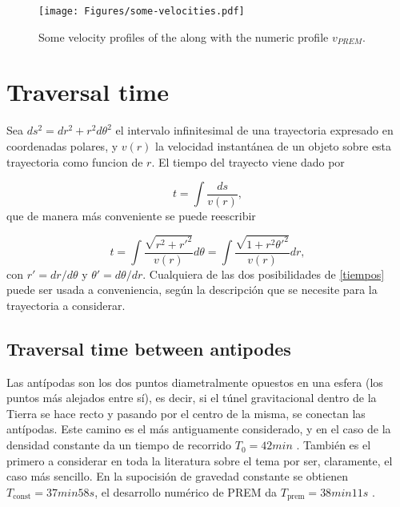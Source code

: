 \documentclass[aps,twocolumn,showpacs,preprintnumbers]{revtex4}
\begin{document}
    \begin{figure}
        \centering
        \texttt{[image: Figures/some-velocities.pdf]}
        \caption{Some velocity profiles of  the along with the numeric profile $v_{PREM}$.}
        \label{fig:some velocities}
    \end{figure}
    
    
    
\section{Traversal time}\label{time section}
        
    Sea $ds^2 = dr^2 + r^2 d\theta^2$ el intervalo infinitesimal de una trayectoria expresado en coordenadas polares, y $v(r)$ la velocidad instantánea de un objeto sobre esta trayectoria como funcion de $r$. El tiempo del trayecto viene dado por
            
            \begin{equation*}
                t = \int \frac{ds}{v(r)},
            \end{equation*}
    que de manera más conveniente se puede reescribir
            
            \begin{equation}
                t = \int \frac{\sqrt{r^2 + {r'}^2}}{v(r)} d\theta = \int \frac{\sqrt{ 1 + r^2 {\theta'}^2}}{v(r)} dr, 
                \label{tiempos}
            \end{equation}
    con ${r'} = dr/d\theta$ y $\theta' = d\theta / dr$. Cualquiera de las dos posibilidades de \eqref{tiempos} puede ser usada a conveniencia, según la descripción que se necesite para la trayectoria a considerar.
            
    \subsection{Traversal time between antipodes}
    
        Las antípodas son los dos puntos diametralmente opuestos en una esfera (los puntos más alejados entre sí), es decir, si el túnel gravitacional dentro de la Tierra se hace recto y pasando por el centro de la misma, se conectan las antípodas. Este camino es el más antiguamente considerado, y en el caso de la densidad constante da un tiempo de recorrido $T_0 = 42min$ \citep{History-Tunels}. También es el primero a considerar en toda la literatura sobre el tema por ser, claramente, el caso más sencillo. En la supocisión de gravedad constante se obtienen $T_{\text{const}} = 37min 58 s$, el desarrollo numérico de PREM da $T_{\text{prem}}=38min 11s$ \cite{gravity-train-prem}.  
        
\end{document}
